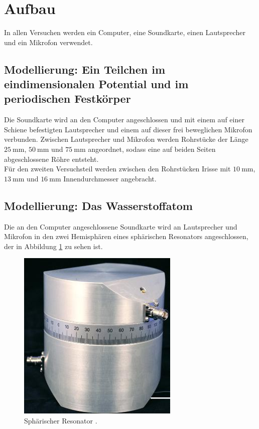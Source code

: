 \section{Aufbau}
\label{sec:Aufbau}

In allen Versuchen werden ein Computer, eine Soundkarte, einen Lautsprecher und ein Mikrofon verwendet.
\subsection{Modellierung: Ein Teilchen im eindimensionalen Potential und im periodischen Festkörper}
Die Soundkarte wird an den Computer angeschlossen und mit einem auf einer Schiene befestigten Lautsprecher und einem auf dieser frei beweglichen Mikrofon verbunden. Zwischen Lautsprecher und Mikrofon werden Rohrstücke der Länge $\SI{25}{\milli\metre}$, $\SI{50}{\milli\metre}$ und $\SI{75}{\milli\metre}$ angeordnet, sodass eine auf beiden Seiten abgeschlossene Röhre entsteht.\\
Für den zweiten Versuchsteil werden zwischen den Rohrstücken Irisse mit $\SI{10}{\milli\metre}$, $\SI{13}{\milli\metre}$ und $\SI{16}{\milli\metre}$ Innendurchmesser angebracht.\newpage
\subsection{Modellierung: Das Wasserstoffatom}
Die an den Computer angeschlossene Soundkarte wird an Lautsprecher und Mikrofon in den zwei Hemisphären eines sphärischen Resonators angeschlossen, der in Abbildung \ref{fig:Res} zu sehen ist.
\begin{figure}
	\centering
	\includegraphics[scale=0.5]{content/images/Res.jpg}
	\caption{Sphärischer Resonator \cite{V23}.}
	\label{fig:Res}
\end{figure}

